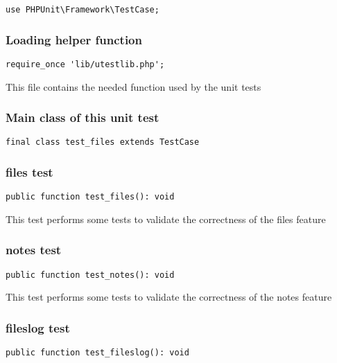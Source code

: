 \documentclass[a4paper]{article}
\begin{document}
\begin{lstlisting}
use PHPUnit\Framework\TestCase;
\end{lstlisting}

\hypertarget{toc176}{}
\subsubsection{Loading helper function}

\begin{lstlisting}
require_once 'lib/utestlib.php';
\end{lstlisting}

This file contains the needed function used by the unit tests

\hypertarget{toc177}{}
\subsubsection{Main class of this unit test}

\begin{lstlisting}
final class test_files extends TestCase
\end{lstlisting}

\hypertarget{toc178}{}
\subsubsection{files test}

\begin{lstlisting}
public function test_files(): void
\end{lstlisting}

This test performs some tests to validate the correctness
of the files feature

\hypertarget{toc179}{}
\subsubsection{notes test}

\begin{lstlisting}
public function test_notes(): void
\end{lstlisting}

This test performs some tests to validate the correctness
of the notes feature

\hypertarget{toc180}{}
\subsubsection{fileslog test}

\begin{lstlisting}
public function test_fileslog(): void
\end{lstlisting}
\end{document}
